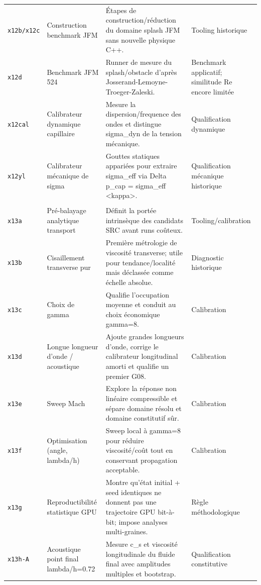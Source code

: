 \documentclass[a4paper,9pt]{article}
\begin{document}
\begin{landscape}
\begin{longtable}{L{2.35cm} L{5.3cm} L{13.25cm} L{4.75cm}}
\texttt{x12b/x12c} & Construction benchmark JFM & Étapes de construction/réduction du domaine splash JFM sans nouvelle physique C++. & Tooling historique \\
\texttt{x12d} & Benchmark JFM 524 & Runner de mesure du splash/obstacle d'après Josserand-Lemoyne-Troeger-Zaleski. & Benchmark applicatif; similitude Re encore limitée \\
\texttt{x12cal} & Calibrateur dynamique capillaire & Mesure la dispersion/frequence des ondes et distingue sigma\_dyn de la tension mécanique. & Qualification dynamique \\
\texttt{x12yl} & Calibrateur mécanique de sigma & Gouttes statiques appariées pour extraire sigma\_eff via Delta p\_cap = sigma\_eff <kappa>. & Qualification mécanique historique \\
\\
\texttt{x13a} & Pré-balayage analytique transport & Définit la portée intrinsèque des candidats SRC avant runs coûteux. & Tooling/calibration \\
\texttt{x13b} & Cisaillement transverse pur & Première métrologie de viscosité transverse; utile pour tendance/localité mais déclassée comme échelle absolue. & Diagnostic historique \\
\texttt{x13c} & Choix de gamma & Qualifie l'occupation moyenne et conduit au choix économique gamma=8. & Calibration \\
\texttt{x13d} & Longue longueur d'onde / acoustique & Ajoute grandes longueurs d'onde, corrige le calibrateur longitudinal amorti et qualifie un premier G08. & Calibration \\
\texttt{x13e} & Sweep Mach & Explore la réponse non linéaire compressible et sépare domaine résolu et domaine constitutif sûr. & Calibration \\
\texttt{x13f} & Optimisation (angle, lambda/h) & Sweep local à gamma=8 pour réduire viscosité/coût tout en conservant propagation acceptable. & Calibration \\
\texttt{x13g} & Reproductibilité statistique GPU & Montre qu'état initial + seed identiques ne donnent pas une trajectoire GPU bit-à-bit; impose analyses multi-graines. & Règle méthodologique \\
\texttt{x13h-A} & Acoustique point final lambda/h=0.72 & Mesure c\_s et viscosité longitudinale du fluide final avec amplitudes multiples et bootstrap. & Qualification constitutive \\

\end{longtable}
\end{landscape}
\end{document}
